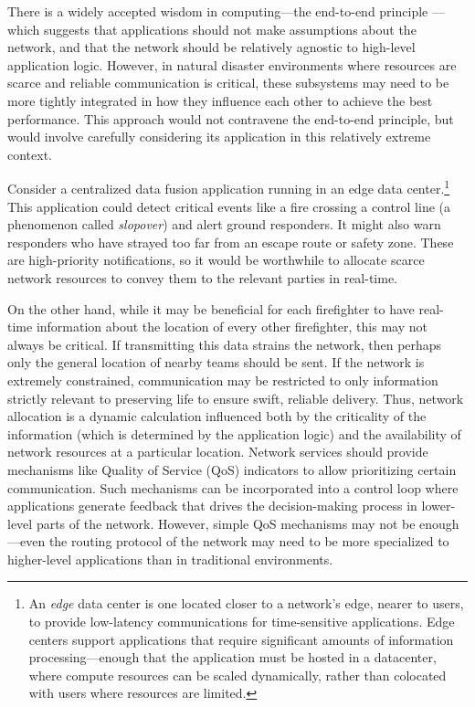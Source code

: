 \documentclass[]             %
{NASA}                       %
\theoremstyle{definition}
\begin{document}
There is a widely accepted wisdom in computing---the end-to-end
principle \cite{1984:end-to-end}---which suggests that
applications should not make assumptions about the network, and that
the network should be relatively agnostic to high-level application
logic. However, in natural disaster environments where resources are
scarce and reliable communication is critical, these subsystems may
need to be more tightly integrated in how they influence each other to
achieve the best performance. This approach would not contravene the
end-to-end principle, but would involve carefully considering its
application in this relatively extreme context.

Consider a centralized data fusion
application running in an edge data center.\footnote{An
  \emph{edge} data center is one located closer to a network's edge,
  nearer to users, to provide low-latency communications for
  time-sensitive applications. Edge centers support applications that
  require significant amounts of information processing---enough that
  the application must be hosted in a datacenter, where compute
  resources can be scaled dynamically, rather than colocated with
  users where resources are limited.} This application could detect
critical events like a fire crossing a control line (a phenomenon
called \emph{slopover}) and alert ground responders. It might also
warn responders who have strayed too far from an escape route or
safety zone. These are high-priority notifications, so it would be
worthwhile to allocate scarce network resources to convey them to the
relevant parties in real-time.

On the other hand, while it may be beneficial for each firefighter to
have real-time information about the location of every other
firefighter, this may not always be critical. If transmitting this
data strains the network, then perhaps only the general location of
nearby teams should be sent. If the network is extremely constrained,
communication may be restricted to only information strictly relevant
to preserving life to ensure swift, reliable delivery. Thus, network
allocation is a dynamic calculation influenced both by the criticality
of the information (which is determined by the application logic) and
the availability of network resources at a particular
location. Network services should provide mechanisms like Quality of
Service (QoS) indicators to allow prioritizing certain
communication. Such mechanisms can be incorporated into a control loop
where applications generate feedback that drives the decision-making
process in lower-level parts of the network. However, simple QoS
mechanisms may not be enough---even the routing protocol of the
network may need to be more specialized to higher-level applications
than in traditional environments.
\end{document}
